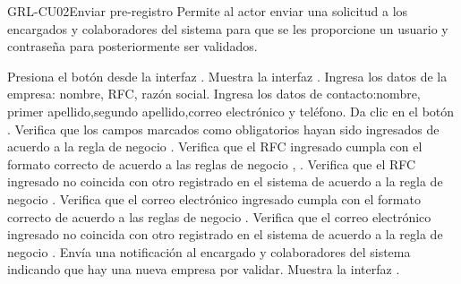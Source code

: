 \begin{UseCase}[]{GRL-CU02}{Enviar pre-registro}{
	Permite al actor enviar una solicitud a los encargados y colaboradores del sistema para que se les proporcione un usuario y contraseña
	para posteriormente ser validados.
}
\end{UseCase}

\begin{UCtrayectoria}
	\UCpaso [\UCactor] Presiona el botón  desde la interfaz .
    \UCpaso [\UCsist] Muestra la interfaz .
	\UCpaso [\UCactor] Ingresa los datos de la empresa: nombre, RFC, 
	razón social.\label{cu02-grl1}
	\UCpaso [\UCactor] Ingresa los datos de contacto:nombre, primer apellido,segundo apellido,correo electrónico y teléfono.
	\UCpaso [\UCactor] Da clic en el botón . 
    \UCpaso [\UCsist] Verifica que los campos marcados como obligatorios hayan sido ingresados de acuerdo a la regla de negocio .
	\UCpaso [\UCsist] Verifica que el RFC ingresado cumpla con el formato correcto de acuerdo a las reglas de negocio  , .
	\UCpaso [\UCsist] Verifica que el RFC ingresado no coincida con otro registrado en el sistema de acuerdo a la regla de negocio .
	\UCpaso [\UCsist] Verifica que el correo electrónico ingresado cumpla con el formato correcto de acuerdo a las reglas de negocio  . \label{cu02-grl2}
	\UCpaso [\UCsist] Verifica que el correo electrónico ingresado no coincida con otro registrado en el sistema de acuerdo a la regla de negocio  .
	\UCpaso [\UCsist] Envía una notificación al encargado y colaboradores del sistema indicando que hay una nueva empresa por validar.
    \UCpaso [\UCsist] Muestra la interfaz .
\end{UCtrayectoria}

